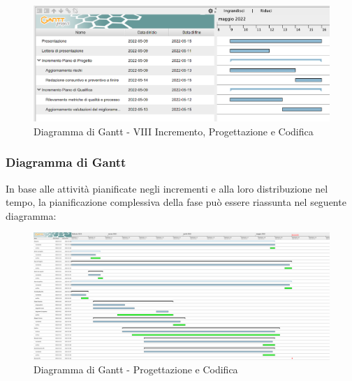 \begin{figure}[H]
	\centering
	\includegraphics[scale=0.45]{Sezioni/gantt/VIII_incremento.png}
	\caption{Diagramma di Gantt - VIII Incremento, Progettazione e Codifica}
\end{figure}

\pagebreak

\subsubsection{Diagramma di Gantt}
In base alle attività pianificate negli incrementi e alla loro distribuzione nel tempo, la pianificazione complessiva della fase può essere riassunta nel seguente diagramma:
\begin{figure}[H]
    \centerfloat
	\includegraphics[width=1.5\textwidth, angle=90 ]{Sezioni/gantt/progettazione_codifica.png}
	\caption{Diagramma di Gantt - Progettazione e Codifica}
\end{figure}

